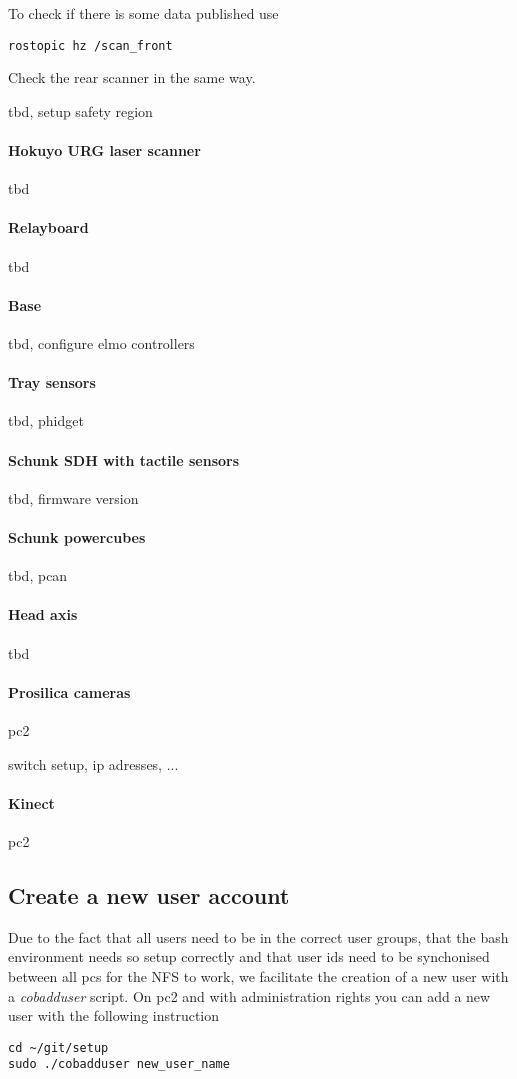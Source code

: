 To check if there is some data published use
\begin{lstlisting}
rostopic hz /scan_front
\end{lstlisting}

Check the rear scanner in the same way.

tbd, setup safety region

\paragraph{Hokuyo URG laser scanner}
tbd

\paragraph{Relayboard}
tbd

\paragraph{Base}
tbd, configure elmo controllers

\paragraph{Tray sensors}
tbd, phidget

\paragraph{Schunk SDH with tactile sensors}
tbd, firmware version

\paragraph{Schunk powercubes}
tbd, pcan

\paragraph{Head axis}
tbd

\paragraph{Prosilica cameras}
pc2

switch setup, ip adresses, ...

\paragraph{Kinect}
pc2


\subsection{Create a new user account}
\label{sec:account}
Due to the fact that all users need to be in the correct user groups, that the bash environment needs so setup correctly and that user ids need to be synchonised between all pcs for the NFS to work, we facilitate the creation of a new user with a \textit{cobadduser} script. On pc2 and with administration rights you can add a new user with the following instruction
\begin{lstlisting}
cd ~/git/setup
sudo ./cobadduser new_user_name
\end{lstlisting}


